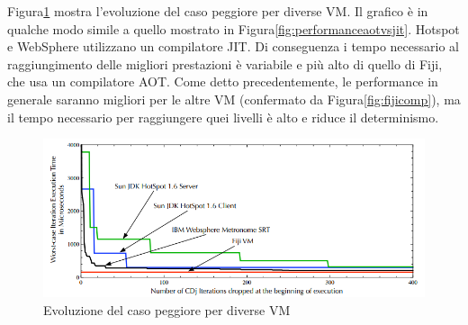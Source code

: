 Figura\ref{fig:fijistartup} mostra l'evoluzione del caso peggiore per diverse VM. Il grafico è in qualche modo simile a quello mostrato in Figura\ref{fig:performanceaotvsjit}. Hotspot e WebSphere utilizzano un compilatore JIT. Di conseguenza i tempo necessario al raggiungimento delle migliori prestazioni è variabile e più alto di quello di Fiji, che usa un compilatore AOT. Come detto precedentemente, le performance in generale saranno migliori per le altre VM (confermato da Figura\ref{fig:fijicomp}), ma il tempo necessario per raggiungere quei livelli è alto e riduce il determinismo.
\begin{figure}[h]
	\centering
	\includegraphics[width=0.8\linewidth]{images/fijistartup}
	\caption[Evoluzione del caso peggiore]{Evoluzione del caso peggiore per diverse VM}
	\label{fig:fijistartup}
\end{figure}

